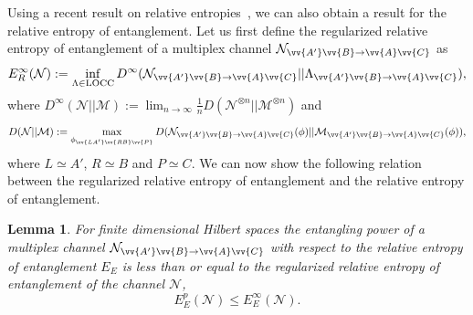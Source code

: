 \documentclass[aps,pra,twocolumn,superscriptaddress,longbibliography]{revtex4-1}
\def\LOCC{\operatorname{LOCC}}
\newcommand{\mc}[1]{\mathcal{#1}}
\newtheorem{lemma}{Lemma}
\begin{document}
Using a recent result on relative entropies~\cite{fang2019chain}, we can also obtain a result for the relative entropy of entanglement. Let us first define the regularized relative entropy of entanglement of a multiplex channel $\mc{N}_{\vv{A'}\vv{B}\to\vv{A}\vv{C}}$ as
\begin{equation}
E^\infty_{R}(\mc{N}):=\inf_{\Lambda\in\LOCC}D^\infty(\mc{N}_{\vv{A'}\vv{B}\to\vv{A}\vv{C}}||\Lambda_{\vv{A'}\vv{B}\to\vv{A}\vv{C}}),
\end{equation}
where $D^\infty(\mc{N}||\mc{M}):=\lim_{n\to\infty}\frac{1}{n}D(\mc{N}^{\otimes n}||\mc{M}^{\otimes n})$ and 
\begin{equation}
D(\mc{N}||\mc{M}):=\max_{\phi_{\vv{LA'}\vv{RB}\vv{P}}}D(\mc{N}_{\vv{A'}\vv{B}\to\vv{A}\vv{C}}(\phi)||\mc{M}_{\vv{A'}\vv{B}\to\vv{A}\vv{C}}(\phi)),
\end{equation}
where $L\simeq A'$, $R\simeq B$ and $P\simeq C$. We can now show the following relation between the regularized relative entropy of entanglement and the relative entropy of entanglement.
\begin{lemma}\label{lem:ree-amor}
For finite dimensional Hilbert spaces the entangling power of a multiplex channel $\mc{N}_{\vv{A'}\vv{B}\to\vv{A}\vv{C}}$ with respect to the relative entropy of entanglement $E_{E}$ is less than or equal to the regularized relative entropy of entanglement of the channel $\mc{N}$,
\begin{equation}
E_{E}^{p}(\mc{N})\leq E^\infty_{E}(\mc{N}).
\end{equation}
\end{lemma}
\end{document}
